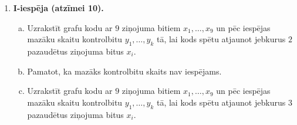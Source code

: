 \documentclass[11pt]{article}
\begin{document}
\begin{enumerate}
\item {\bf I-iespēja (atzīmei 10).} 
\begin{enumerate}[(a)]
\item Uzrakstīt grafu kodu ar $9$ ziņojuma bitiem $x_1,\ldots,x_{9}$ 
un pēc iespējas mazāku skaitu kontrolbitu $y_1,\ldots,y_k$ tā, 
lai kods spētu atjaunot jebkurus $2$ pazaudētus ziņojuma bitus $x_i$.
\item Pamatot, ka mazāks kontrolbitu skaits nav iespējams.
\item Uzrakstīt grafu kodu ar $9$ ziņojuma bitiem $x_1,\ldots,x_{9}$ 
un pēc iespējas mazāku skaitu kontrolbitu $y_1,\ldots,y_k$ tā, 
lai kods spētu atjaunot jebkurus $3$ pazaudētus ziņojuma bitus $x_i$.
\end{enumerate}
\end{enumerate}
\end{document}
